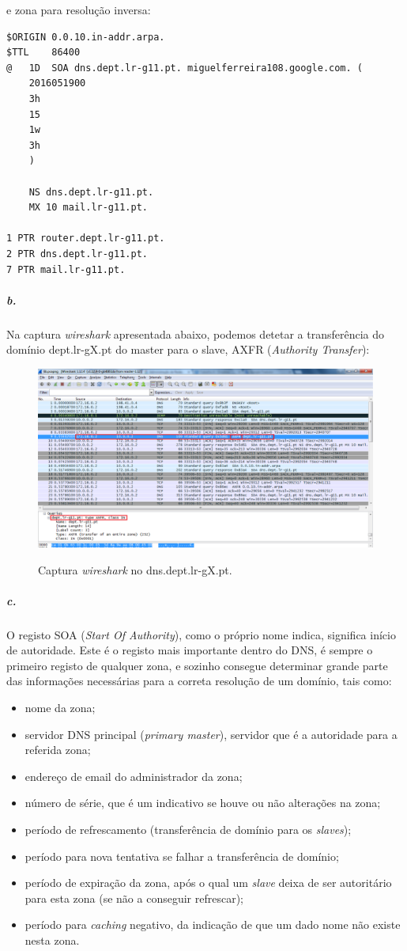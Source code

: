 e zona para resolução inversa:

\begin{verbatim}
$ORIGIN	0.0.10.in-addr.arpa.
$TTL	86400
@	1D	SOA dns.dept.lr-g11.pt.	miguelferreira108.google.com. (
	2016051900
	3h
	15
	1w
	3h
	)

	NS dns.dept.lr-g11.pt.
	MX 10 mail.lr-g11.pt.

1 PTR router.dept.lr-g11.pt.
2 PTR dns.dept.lr-g11.pt.
7 PTR mail.lr-g11.pt.
\end{verbatim}


\subparagraph{b.}
Na captura \emph{wireshark} apresentada abaixo, podemos detetar a transferência do domínio \textsf{dept.lr-gX.pt} do \textsf{master} para o \textsf{slave}, \textsf{AXFR} (\emph{Authority Transfer}):

\begin{figure}[h]
\centering
\includegraphics[width=1\textwidth, height=0.38\textheight]{6b_cap.png}
\label{fig:2-capturaWireshark}
\caption{Captura \emph{wireshark} no \textsf{dns.dept.lr-gX.pt}.}
\end{figure}


\subparagraph{c.}
O registo SOA (\emph{Start Of Authority}), como o próprio nome indica, significa início de autoridade. Este é o registo mais importante dentro do DNS, é sempre o primeiro registo de qualquer zona, e sozinho consegue determinar grande parte das informações necessárias para a correta resolução de um domínio, tais como:
\begin{itemize}
\item nome da zona;
\item servidor DNS principal (\emph{primary master}), servidor que é a autoridade para a referida zona;
\item endereço de email do administrador da zona;
\item número de série, que é um indicativo se houve ou não alterações na zona;
\item período de refrescamento (transferência de domínio para os \emph{slaves});
\item período para nova tentativa se falhar a transferência de domínio;
\item período de expiração da zona, após o qual um \emph{slave} deixa de ser autoritário para esta zona (se não a conseguir refrescar);
\item período para \emph{caching} negativo, da indicação de que um dado nome não existe nesta zona.
\end{itemize}

